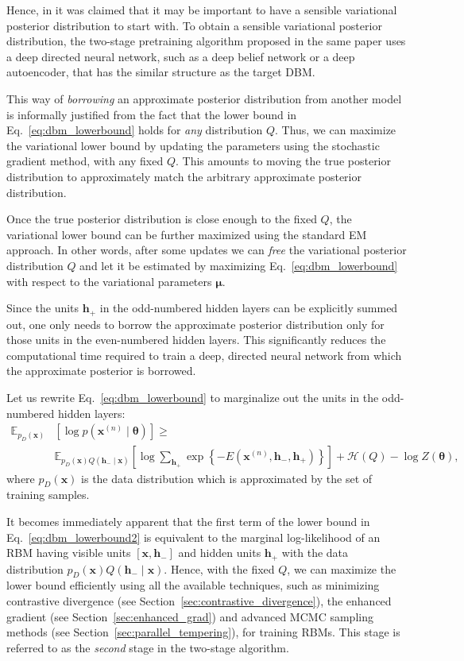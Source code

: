 \documentclass[dissertation,nocontribution,draft*]{aaltoseries}
\newcommand{\vect}[1]{\mathbf{#1}}
\newcommand{\vects}[1]{\boldsymbol{#1}}
\newcommand{\vh}[0]{\vect{h}}
\newcommand{\vx}[0]{\vect{x}}
\newcommand{\vmu}[0]{\vects{\mu}}
\newcommand{\TT}[0]{{\vects{\theta}}}
\newcommand{\HH}[0]{\mathcal{H}}
\newcommand{\E}[0]{\mathbb{E}}
\begin{document}
Hence, in  it was claimed that it may
be important to have a sensible variational posterior
distribution to start with. To obtain a sensible variational
posterior distribution, the two-stage pretraining algorithm
proposed in the same paper uses a deep directed
neural network, such as a deep belief network or a deep
autoencoder, that has the similar structure as the target
DBM.

This way of \textit{borrowing} an approximate posterior
distribution from another model is informally justified from
the fact that the lower bound in
Eq.~\eqref{eq:dbm_lowerbound} holds for \textit{any}
distribution $Q$. Thus, we can maximize the variational
lower bound by updating the parameters using the stochastic
gradient method, with any fixed $Q$. This amounts to moving
the true posterior distribution to approximately match the
arbitrary approximate posterior distribution.

Once the true posterior distribution is close enough to the
fixed $Q$, the variational lower bound can be further
maximized using the standard EM approach. In other words,
after some updates we can \textit{free} the variational
posterior distribution $Q$ and let it be estimated by
maximizing Eq.~\eqref{eq:dbm_lowerbound} with respect to the
variational parameters $\vmu$.

Since the units $\vh_+$
in the odd-numbered hidden layers can be explicitly summed
out, one only needs to borrow the approximate
posterior distribution only for those units in the
even-numbered hidden layers. This significantly reduces the
computational time required to train a deep, directed neural
network from which the approximate posterior is borrowed.

Let us rewrite Eq.~\eqref{eq:dbm_lowerbound} to marginalize
out the units in the odd-numbered hidden layers:
\begin{align}
    \label{eq:dbm_lowerbound2}
    \E_{p_D(\vx)} &\left[ \log p(\vx^{(n)} \mid \TT) \right]
    \geq 
    \nonumber \\
    &\E_{p_D(\vx)Q(\vh_- \mid \vx)} \left[ \log \sum_{\vh_+} \exp\left\{ -E
    (\vx^{(n)}, \vh_-, \vh_+)\right\} \right] + \HH(Q) - \log Z(\TT),
\end{align}
where $p_D(\vx)$ is the data distribution which is
approximated by the set of training samples.

It becomes immediately apparent that the first term of the
lower bound in Eq.~\eqref{eq:dbm_lowerbound2} is equivalent
to the marginal log-likelihood of an RBM having visible
units $\left[ \vx, \vh_- \right]$ and hidden units $\vh_+$
with the data distribution $p_D(\vx) Q(\vh_-\mid\vx)$.
Hence, with the fixed $Q$, we can maximize the lower bound
efficiently using all the available techniques, such as
minimizing contrastive divergence (see
Section~\ref{sec:contrastive_divergence}), the enhanced
gradient (see Section~\ref{sec:enhanced_grad}) and advanced
MCMC sampling methods (see
Section~\ref{sec:parallel_tempering}), for training RBMs.
This stage is referred to as the \textit{second} stage in
the two-stage algorithm.
\end{document}
